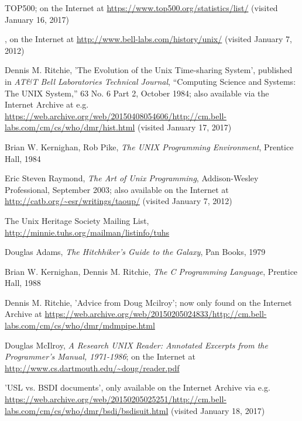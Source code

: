 
\begin{thebibliography}{99}

 TOP500; on the Internet at
\url{https://www.top500.org/statistics/list/}
(visited January 16, 2017)

, on the Internet at
\url{http://www.bell-labs.com/history/unix/}
(visited January 7, 2012)

Dennis M. Ritchie, 'The Evolution of the Unix
Time-sharing System', published in {\em AT\&T Bell Laboratories Technical
Journal}, ``Computing Science and Systems: The UNIX System,'' 63 No. 6
Part 2, October 1984;  also available via the Internet Archive at e.g.
\url{https://web.archive.org/web/20150408054606/http://cm.bell-labs.com/cm/cs/who/dmr/hist.html} (visited January 17, 2017)

Brian W. Kernighan, Rob Pike, {\em The UNIX
Programming Environment}, Prentice Hall, 1984

Eric Steven Raymond, {\em The Art of Unix Programming},
Addison-Wesley Professional, September 2003; also available on the
Internet at
\url{http://catb.org/~esr/writings/taoup/} (visited January 7, 2012)

The Unix Heritage Society Mailing List,
\url{http://minnie.tuhs.org/mailman/listinfo/tuhs}

Douglas Adams, {\em The Hitchhiker's Guide to the Galaxy},
Pan Books, 1979

Brian W. Kernighan, Dennis M. Ritchie, {\em The C Programming
Language}, Prentice Hall, 1988

Dennis M. Ritchie, 'Advice
from Doug Mcilroy'; now only found on the Internet
Archive at
\url{https://web.archive.org/web/20150205024833/http://cm.bell-labs.com/cm/cs/who/dmr/mdmpipe.html}

Douglas McIlroy, {\em
A Research UNIX Reader: Annotated Excerpts from the
Programmer's Manual, 1971-1986}; on the Internet at
\url{http://www.cs.dartmouth.edu/~doug/reader.pdf}

'USL vs. BSDI documents', only available on the Internet Archive via e.g.
\url{https://web.archive.org/web/20150205025251/http://cm.bell-labs.com/cm/cs/who/dmr/bsdi/bsdisuit.html} (visited January
18, 2017)


\end{thebibliography}
